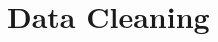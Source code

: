 \documentclass[
 size=14pt,
 paper=smartboard,  %
 mode=present, 		%
 display=slides, 	%
 style=tuliplab,  	%
 pauseslide,
 fleqn,leqno]{powerdot}
\begin{document}





\section{Data Cleaning}


\end{document}
